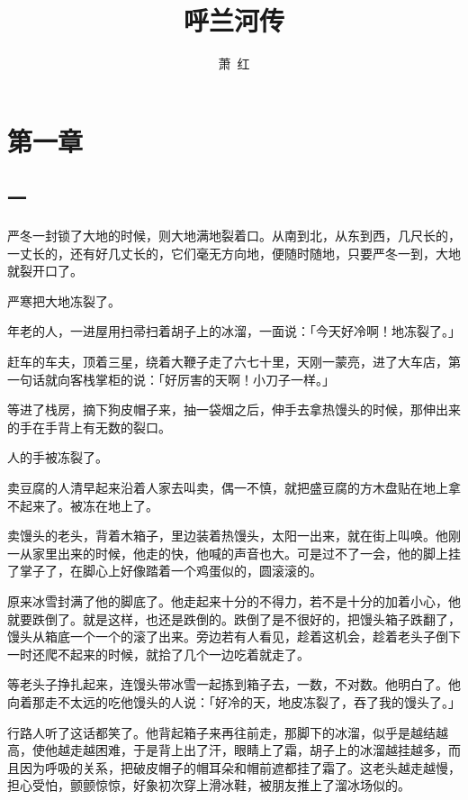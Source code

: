 \documentclass[UTF8]{ctexart}
\title{呼兰河传}
\author{萧\ 红}
\date{}
\begin{document}
\maketitle

\newpage

\section{第一章}

\subsection{一}

严冬一封锁了大地的时候，则大地满地裂着口。从南到北，从东到西，几尺长的，一丈长的，还有好几丈长的，它们毫无方向地，便随时随地，只要严冬一到，大地就裂开口了。

严寒把大地冻裂了。

年老的人，一进屋用扫帚扫着胡子上的冰溜，一面说：「今天好冷啊！地冻裂了。」

赶车的车夫，顶着三星，绕着大鞭子走了六七十里，天刚一蒙亮，进了大车店，第一句话就向客栈掌柜的说：「好厉害的天啊！小刀子一样。」

等进了栈房，摘下狗皮帽子来，抽一袋烟之后，伸手去拿热馒头的时候，那伸出来的手在手背上有无数的裂口。

人的手被冻裂了。

卖豆腐的人清早起来沿着人家去叫卖，偶一不慎，就把盛豆腐的方木盘贴在地上拿不起来了。被冻在地上了。

卖馒头的老头，背着木箱子，里边装着热馒头，太阳一出来，就在街上叫唤。他刚一从家里出来的时候，他走的快，他喊的声音也大。可是过不了一会，他的脚上挂了掌子了，在脚心上好像踏着一个鸡蛋似的，圆滚滚的。

原来冰雪封满了他的脚底了。他走起来十分的不得力，若不是十分的加着小心，他就要跌倒了。就是这样，也还是跌倒的。跌倒了是不很好的，把馒头箱子跌翻了，馒头从箱底一个一个的滚了出来。旁边若有人看见，趁着这机会，趁着老头子倒下一时还爬不起来的时候，就拾了几个一边吃着就走了。

等老头子挣扎起来，连馒头带冰雪一起拣到箱子去，一数，不对数。他明白了。他向着那走不太远的吃他馒头的人说：「好冷的天，地皮冻裂了，吞了我的馒头了。」

行路人听了这话都笑了。他背起箱子来再往前走，那脚下的冰溜，似乎是越结越高，使他越走越困难，于是背上出了汗，眼睛上了霜，胡子上的冰溜越挂越多，而且因为呼吸的关系，把破皮帽子的帽耳朵和帽前遮都挂了霜了。这老头越走越慢，担心受怕，颤颤惊惊，好象初次穿上滑冰鞋，被朋友推上了溜冰场似的。
\end{document}
